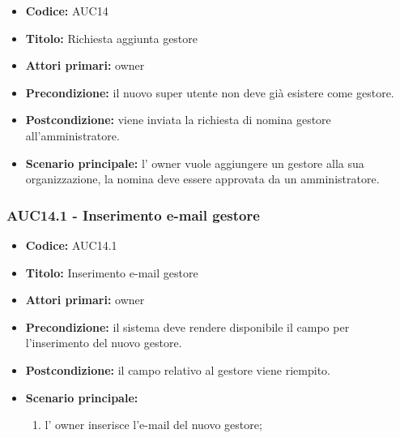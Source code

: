 \documentclass[casi-duso]{subfiles}
\begin{document}
\begin{itemize}
  \item \textbf{Codice:} AUC14
  \item \textbf{Titolo:} Richiesta aggiunta gestore
  \item \textbf{Attori primari:} owner
  \item \textbf{Precondizione:} il nuovo super utente non deve già esistere come gestore.
  \item \textbf{Postcondizione:} viene inviata la richiesta di nomina gestore all'amministratore.
  \item \textbf{Scenario principale:} l' owner vuole aggiungere un gestore alla sua organizzazione, la nomina deve essere approvata da un 
  amministratore.
\end{itemize}

\subsubsection{AUC14.1 - Inserimento e-mail gestore}%
\label{subsub:AUC14.1}
\begin{itemize}
  \item \textbf{Codice:} AUC14.1
  \item \textbf{Titolo:} Inserimento e-mail gestore
  \item \textbf{Attori primari:} owner
  \item \textbf{Precondizione:} il sistema deve rendere disponibile il campo per l'inserimento del nuovo gestore.
  \item \textbf{Postcondizione:} il campo relativo al gestore viene riempito.
  \item \textbf{Scenario principale:} 
  \begin{enumerate}
    \item l' owner inserisce l'e-mail del nuovo gestore;
  \end{enumerate}
\end{itemize}

\end{document}
